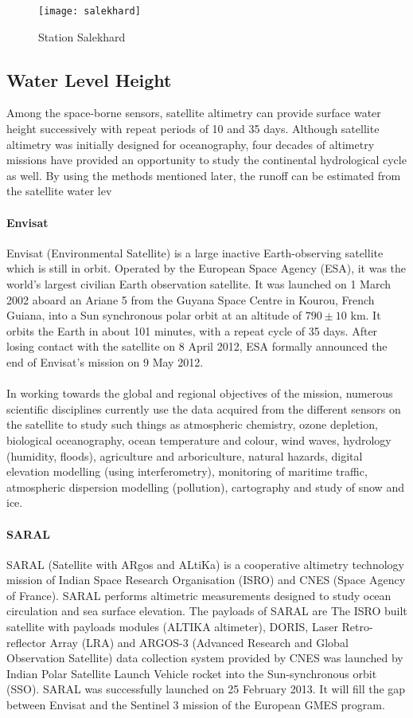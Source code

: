 \begin{figure}[htbp]
	\centering
	\texttt{[image: salekhard]} %
	\caption{Station Salekhard} 
	\label{fig:Salekhard}
\end{figure}
\subsection{Water Level Height}
 Among the space-borne sensors, satellite altimetry can provide surface water height successively with repeat periods of 10 and 35 days. Although satellite altimetry was initially designed for oceanography, four decades of altimetry missions have provided an opportunity to study the continental hydrological cycle as well. By using the methods mentioned later, the runoff can be estimated from the satellite water lev
 \paragraph{Envisat}
Envisat (Environmental Satellite) is a large inactive Earth-observing satellite which is still in orbit. Operated by the European Space Agency (ESA), it was the world's largest civilian Earth observation satellite. It was launched on 1 March 2002 aboard an Ariane 5 from the Guyana Space Centre in Kourou, French Guiana, into a Sun synchronous polar orbit at an altitude of $790 \pm 10$ km. It orbits the Earth in about 101 minutes, with a repeat cycle of 35 days. After losing contact with the satellite on 8 April 2012, ESA formally announced the end of Envisat's mission on 9 May 2012.\\\\
In working towards the global and regional objectives of the mission, numerous scientific disciplines currently use the data acquired from the different sensors on the satellite to study such things as atmospheric chemistry, ozone depletion, biological oceanography, ocean temperature and colour, wind waves, hydrology (humidity, floods), agriculture and arboriculture, natural hazards, digital elevation modelling (using interferometry), monitoring of maritime traffic, atmospheric dispersion modelling (pollution), cartography and study of snow and ice.
\paragraph{SARAL}
SARAL (Satellite with ARgos and ALtiKa) is a cooperative altimetry technology mission of Indian Space Research Organisation (ISRO) and CNES (Space Agency of France). SARAL performs altimetric measurements designed to study ocean circulation and sea surface elevation. The payloads of SARAL are The ISRO built satellite with payloads modules (ALTIKA altimeter), DORIS, Laser Retro-reflector Array (LRA) and ARGOS-3 (Advanced Research and Global Observation Satellite) data collection system provided by CNES was launched by Indian Polar Satellite Launch Vehicle rocket into the Sun-synchronous orbit (SSO). SARAL was successfully launched on 25 February 2013. It will fill the gap between Envisat and the Sentinel 3 mission of the European GMES program.
